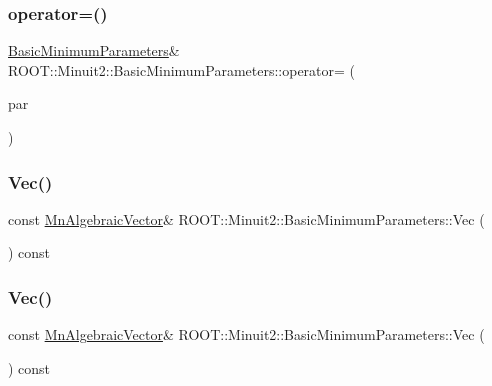 \subsubsection{\texorpdfstring{operator=()}{operator=()}\hspace{0.1cm}{\footnotesize\ttfamily [2/2]}}
{\footnotesize\ttfamily \mbox{\hyperlink{classROOT_1_1Minuit2_1_1BasicMinimumParameters}{Basic\+Minimum\+Parameters}}\& R\+O\+O\+T\+::\+Minuit2\+::\+Basic\+Minimum\+Parameters\+::operator= (\begin{DoxyParamCaption}\item[{const \mbox{\hyperlink{classROOT_1_1Minuit2_1_1BasicMinimumParameters}{Basic\+Minimum\+Parameters}} \&}]{par }\end{DoxyParamCaption})\hspace{0.3cm}{\ttfamily [inline]}}

\mbox{\label{classROOT_1_1Minuit2_1_1BasicMinimumParameters_ae8dc429aa9491e545efd916d4f72f8dd}} 
\subsubsection{\texorpdfstring{Vec()}{Vec()}\hspace{0.1cm}{\footnotesize\ttfamily [1/2]}}
{\footnotesize\ttfamily const \mbox{\hyperlink{namespaceROOT_1_1Minuit2_a62ed97730a1ca8d3fbaec64a19aa11c9}{Mn\+Algebraic\+Vector}}\& R\+O\+O\+T\+::\+Minuit2\+::\+Basic\+Minimum\+Parameters\+::\+Vec (\begin{DoxyParamCaption}{ }\end{DoxyParamCaption}) const\hspace{0.3cm}{\ttfamily [inline]}}

\mbox{\label{classROOT_1_1Minuit2_1_1BasicMinimumParameters_ae8dc429aa9491e545efd916d4f72f8dd}} 
\subsubsection{\texorpdfstring{Vec()}{Vec()}\hspace{0.1cm}{\footnotesize\ttfamily [2/2]}}
{\footnotesize\ttfamily const \mbox{\hyperlink{namespaceROOT_1_1Minuit2_a62ed97730a1ca8d3fbaec64a19aa11c9}{Mn\+Algebraic\+Vector}}\& R\+O\+O\+T\+::\+Minuit2\+::\+Basic\+Minimum\+Parameters\+::\+Vec (\begin{DoxyParamCaption}{ }\end{DoxyParamCaption}) const\hspace{0.3cm}{\ttfamily [inline]}}



